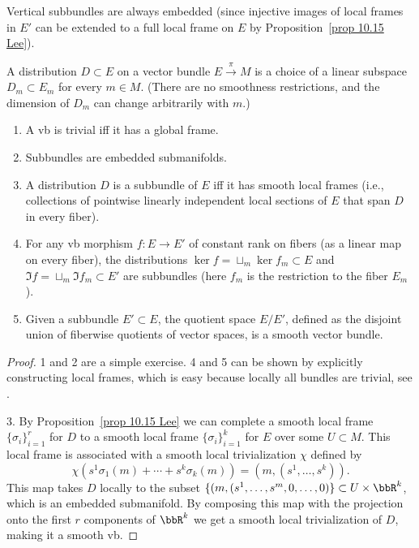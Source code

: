 \begin{rem}
    Vertical subbundles are always embedded (since injective images of local frames in $E'$ can be extended to a full local frame on $E$ by Proposition~\ref{prop 10.15 Lee}).
\end{rem}

\begin{defn}[Distribution]
    A distribution $D\subset E$ on a vector bundle $E\overset{\pi}{\to}M$ is a choice of a linear subspace $D_m\subset E_m$ for every $m\in M$. (There are no smoothness restrictions, and the dimension of $D_m$ can change arbitrarily with $m$.)
\end{defn}
\begin{thm}\label{subbundles thm}
\begin{enumerate}
    \item A \gls{vb} is trivial iff it has a global frame.
    \item Subbundles are embedded submanifolds.
    \item A distribution $D$ is a subbundle of $E$ iff it has smooth local frames (i.e., collections of pointwise linearly independent local sections of $E$ that span $D$ in every fiber).
    \item For any \gls{vb} morphism $f:E\to E'$ of constant rank on fibers (as a linear map on every fiber), the distributions $\ker f=\sqcup_m \ker f_m\subset E$ and $\Im f=\sqcup_m \Im f_m\subset E'$ are subbundles (here $f_m$ is the restriction to the fiber $E_m$).
    \item Given a subbundle $E'\subset E$,  the quotient space $E/E'$, defined as the disjoint union of fiberwise quotients of vector spaces, is a smooth vector bundle.
\end{enumerate}
\end{thm}
\begin{proof}
    1 and 2 are a simple exercise. 4 and 5 can be shown by explicitly constructing local frames, which is easy because locally all bundles are trivial, see \cite[Thm.~10.34]{Lee}.

    3. By Proposition~\ref{prop 10.15 Lee} we can complete a smooth local frame $\{\sigma_i\}_{i=1}^r$ for $D$ to a smooth local frame $\{\sigma_i\}_{i=1}^k$ for $E$ over some $U\subset M$. This local frame is associated with a smooth local trivialization $\chi$ defined by 
    \[\chi(s^1\sigma_1(m)+\cdots+s^k\sigma_k(m))=(m,(s^1,\ldots,s^k)).\]
    This map takes $D$ locally to the subset $\{(m,(s^1,\ldots,s^m,0,\ldots,0)\}\subset U\times \bbR^k$, which is an embedded submanifold. By composing this map with the projection onto the first $r$ components of $\bbR^k$ we get a smooth local trivialization of $D$, making it a smooth \gls{vb}.
\end{proof}



